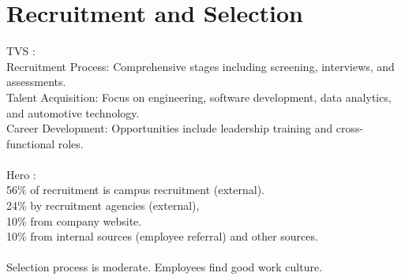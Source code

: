 \section{Recruitment and Selection}
TVS : \\
Recruitment Process: Comprehensive stages including screening, interviews, and assessments.\\Talent Acquisition: Focus on engineering, software development, data analytics, and automotive technology.\\Career Development: Opportunities include leadership training and cross-functional roles.
\\\\
Hero : \\
56\% of recruitment is campus recruitment (external).\\ 24\% by recruitment agencies (external),\\ 10\% from company website.\\ 10\% from internal sources (employee referral) and other sources. \\\\
Selection process is moderate. Employees find good work culture.